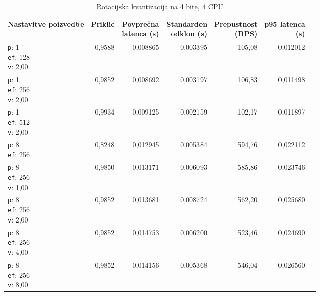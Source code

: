 \begin{table}[htbp]
  \centering
\small
  \caption{Rotacijska kvantizacija na 4 bite, 4 CPU}
  \label{tab:single-4cpu-4ram:tq4:qdrant-dipl-baseline-tenant-subgraph-tq4-ext-m16-ef-128-random-768-100-tenants-extended-upload-2026-08-19-23-18-12.json}
  \begin{tabularx}{\textwidth}{Xrrrrrr}
    \toprule
    Nastavitve poizvedbe & Priklic & \makecell{Povprečna\\latenca (s)} & \makecell{Standarden\\odklon (s)} & \makecell{Prepustnost\\(RPS)} & \makecell{p95 latenca\\(s)}  \\
    \midrule
    \makecell{\texttt{p}: 1\\\texttt{ef}: 128\\\texttt{v}: 2,00} & 0,9588 & 0,008865 & 0,003395 & 105,08 & 0,012012 \\
    \makecell{\texttt{p}: 1\\\texttt{ef}: 256\\\texttt{v}: 2,00} & 0,9852 & 0,008692 & 0,003197 & 106,83 & 0,011498 \\
    \makecell{\texttt{p}: 1\\\texttt{ef}: 512\\\texttt{v}: 2,00} & 0,9934 & 0,009125 & 0,002159 & 102,17 & 0,011897 \\
    \makecell{\texttt{p}: 8\\\texttt{ef}: 256} & 0,8248 & 0,012945 & 0,005384 & 594,76 & 0,022112 \\
    \makecell{\texttt{p}: 8\\\texttt{ef}: 256\\\texttt{v}: 1,00} & 0,9850 & 0,013171 & 0,006093 & 585,86 & 0,023746 \\
    \makecell{\texttt{p}: 8\\\texttt{ef}: 256\\\texttt{v}: 2,00} & 0,9852 & 0,013681 & 0,008724 & 562,20 & 0,025680 \\
    \makecell{\texttt{p}: 8\\\texttt{ef}: 256\\\texttt{v}: 4,00} & 0,9852 & 0,014753 & 0,006200 & 523,46 & 0,024690 \\
    \makecell{\texttt{p}: 8\\\texttt{ef}: 256\\\texttt{v}: 8,00} & 0,9852 & 0,014156 & 0,005368 & 546,04 & 0,026560 \\

\end{tabularx}
\end{table}
